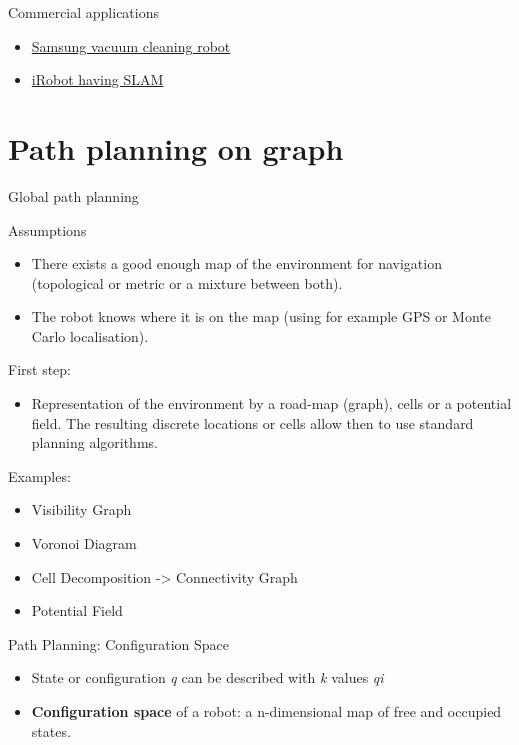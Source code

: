 \documentclass[compress]{beamer}
\begin{document}
\begin{frame}{Commercial applications}

\begin{itemize}
\item \href{https://www.youtube.com/watch?v=bq5HZzGF3vQ}{Samsung vacuum
  cleaning robot}
\item \href{https://www.youtube.com/watch?v=bq5HZzGF3vQ}{iRobot having SLAM}
\end{itemize}

\end{frame}

\section{Path planning on graph}

\begin{frame}{Global path planning}

Assumptions

\begin{itemize}
\item There exists a good enough map of the environment for navigation
  (topological or metric or a mixture between both).
\item The robot knows where it is on the map (using for example GPS or Monte
  Carlo localisation).
\end{itemize}

First step:

\begin{itemize}
\item Representation of the environment by a road-map (graph), cells or a
  potential field. The resulting discrete locations or cells allow then
  to use standard planning algorithms.
\end{itemize}

Examples:

\begin{itemize}
\item Visibility Graph
\item Voronoi Diagram
\item Cell Decomposition -\textgreater{} Connectivity Graph
\item Potential Field
\end{itemize}

\end{frame}

\begin{frame}{Path Planning: Configuration Space}

\begin{itemize}
\item State or configuration \emph{q} can be described with \emph{k} values
  \emph{qi}
\item \textbf{Configuration space} of a robot: a n-dimensional map of free
  and occupied states.
\end{itemize}

\end{frame}
\end{document}
